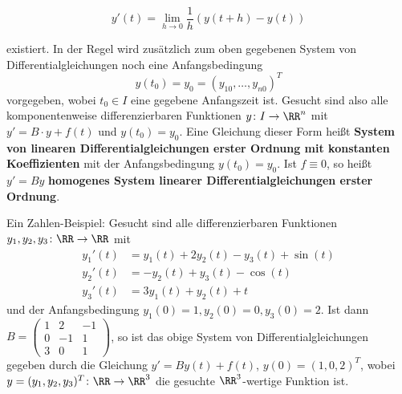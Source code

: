 \[
	y'(t) = \lim\limits_{h \rightarrow 0} \frac{1}{h} (y(t+h)-y(t))
\]

existiert.
In der Regel wird zusätzlich zum oben gegebenen System von Differentialgleichungen noch eine Anfangsbedingung
\[
	y(t_0) = y_0 = (y_{10},\dots,y_{n0})^T
\]
vorgegeben, wobei $t_0 \in I$ eine gegebene Anfangszeit ist.
Gesucht sind also alle komponentenweise differenzierbaren Funktionen $y \colon I \rightarrow \RR^n$ mit $y' = B \cdot y + f(t)$ und $y(t_0) = y_0$.
Eine Gleichung dieser Form heißt \textbf{System von linearen Differentialgleichungen erster Ordnung mit konstanten Koeffizienten} mit der Anfangsbedingung $y(t_0) = y_0$.
Ist $f \equiv 0$, so heißt $y' = By$ \textbf{homogenes System linearer Differentialgleichungen erster Ordnung}.

\begin{beispiel}
	\label{bsp:10.11}
	Ein Zahlen-Beispiel:
	Gesucht sind alle differenzierbaren Funktionen $y_1,y_2,y_3\colon \RR \rightarrow \RR$ mit
	\begin{align*}
	y_1'(t) &= y_1(t) + 2y_2(t) - y_3(t) + \sin(t) \\
	y_2'(t) &= -y_2(t) + y_3(t) - \cos(t) \\
	y_3'(t) &= 3y_1(t) + y_2(t) + t
	\end{align*}
	und der Anfangsbedingung $y_1(0) = 1, y_2(0) = 0, y_3(0)=2$.
	Ist dann $B = \begin{pmatrix}
		1 & 2  & -1 \\
		0 & -1 & 1  \\
		3 & 0  & 1
	\end{pmatrix}$, so ist das obige System von Differentialgleichungen gegeben durch die Gleichung $y' = By(t) + f(t)$, $y(0) = (1,0,2)^T$, wobei $y = (y_1,y_2,y_3)^T \colon \RR \rightarrow \RR^3$ die gesuchte $\RR^3$-wertige Funktion ist.
\end{beispiel}

